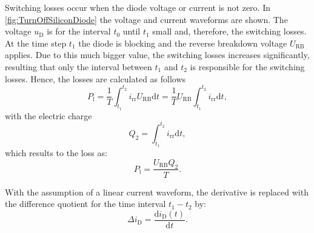 \begin{solutionblock}
    Switching losses occur when the diode voltage or current is not zero. In \autoref{fig:TurnOffSiliconDiode} the voltage and current waveforms are shown. The voltage $u_{\mathrm{D}}$ is for the interval $t_0$ until $t_1$ small and, therefore, the switching losses. At the time step $t_1$ the diode is blocking and the reverse breakdown voltage $U_{\mathrm{RB}}$ applies. Due to this much bigger value, the switching losses increases significantly, resulting that only the interval between $t_1$ and $t_2$ is responsible for the switching losses. Hence, the losses are calculated as follows
    \begin{equation}
        P_{\mathrm{l}} = \frac{1}{T} \int_{t_1}^{t_2} i_{\mathrm{rr}} U_{\mathrm{RB}} \mathrm{d}t = \frac{1}{T} U_{\mathrm{RB}} \int_{t_1}^{t_2} i_{\mathrm{rr}} \mathrm{d}t,
    \end{equation}
    with the electric charge
    \begin{equation}
        Q_2 = \int_{t_1}^{t_2} i_{\mathrm{rr}} \mathrm{d}t,
        \label{eq:chargeQ2}
    \end{equation}
    which results to the loss as:
    \begin{equation}
        P_{\mathrm{l}} = \frac{U_{\mathrm{RB}}Q_2}{T}.
    \end{equation}

    With the assumption of a linear current waveform, the derivative is replaced with the difference quotient for the time interval $t_1 - t_2$ by:
    \begin{equation}
        \Delta i_{\mathrm{D}} = \frac{\mathrm{d}i_{\mathrm{D}}(t)}{\mathrm{d}t}.
    \end{equation}
    

\end{solutionblock}
